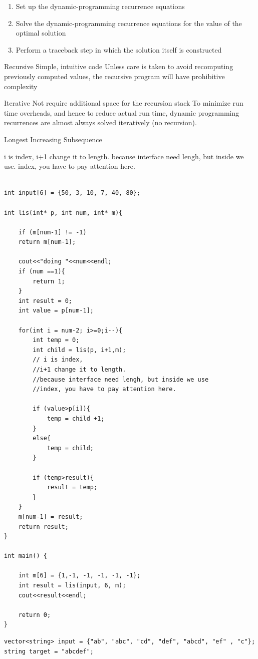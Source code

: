 \documentclass[a4paper,12pt,twoside]{book}
\begin{document}
\begin{itemize}
\begin{enumerate}
\item Set up the dynamic-programming recurrence equations
\item Solve the dynamic-programming recurrence equations for the value of the optimal solution
\item Perform a traceback step in which the solution itself is constructed
\end{enumerate}


Recursive
Simple, intuitive code
Unless care is taken to avoid recomputing previously computed values, the recursive program will have prohibitive complexity

Iterative
Not require additional space for the recursion stack
To minimize run time overheads, and hence to reduce actual run time, dynamic programming recurrences are almost always solved iteratively    (no recursion).


Longest Increasing Subsequence

i is index, i+1 change it to length. because interface need lengh, but inside we use. index, you have to pay attention here.

\begin{lstlisting}[numbers=none]

int input[6] = {50, 3, 10, 7, 40, 80};

int lis(int* p, int num, int* m){
	
	if (m[num-1] != -1)
	return m[num-1];
	
	cout<<"doing "<<num<<endl;
	if (num ==1){
		return 1;
	}
	int result = 0;
	int value = p[num-1];
	
	for(int i = num-2; i>=0;i--){
		int temp = 0;
		int child = lis(p, i+1,m); 
		// i is index, 
		//i+1 change it to length. 
		//because interface need lengh, but inside we use 
		//index, you have to pay attention here.
		
		if (value>p[i]){
			temp = child +1;
		}
		else{
			temp = child;
		}
		
		if (temp>result){
			result = temp;
		}
	}
	m[num-1] = result;
	return result;
}

int main() {
	
	int m[6] = {1,-1, -1, -1, -1, -1};
	int result = lis(input, 6, m);
	cout<<result<<endl;
	
	return 0;
}
\end{lstlisting}



\begin{lstlisting}[numbers=none]
vector<string> input = {"ab", "abc", "cd", "def", "abcd", "ef" , "c"};
string target = "abcdef";


\end{lstlisting}
\end{itemize}
\end{document}
